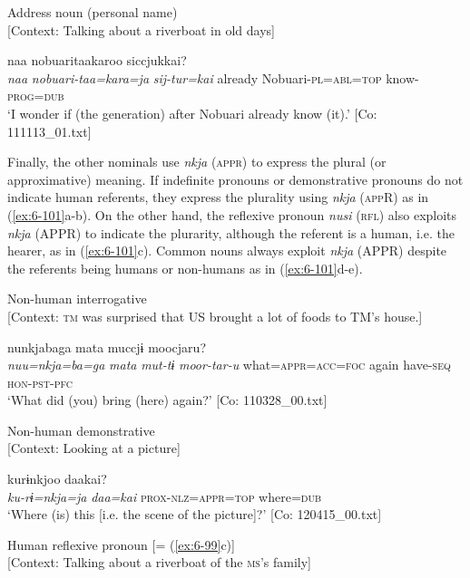 \ex Address noun (personal name)\\{}
[Context: Talking about a riverboat in old days]

{\TM}
\glll naa  nobuaritaakaroo  siccjukkai?\\
      \textit{naa}  \textit{nobuari-taa=kara=ja}  \textit{sij-tur=kai}
      already  Nobuari-\textsc{pl}=\textsc{abl}=\textsc{top}  know-\textsc{prog}=\textsc{dub}\\
\glt ‘I wonder if (the generation) after Nobuari already know (it).’ [Co: 111113\_01.txt]
\z

  Finally, the other nominals use \textit{nkja} (\textsc{appr}) to express the plural (or approximative) meaning. If indefinite pronouns or demonstrative pronouns do not indicate human referents, they express the plurality using \textit{nkja} (\textsc{app}R) as in (\ref{ex:6-101}a-b). On the other hand, the reflexive pronoun \textit{nusi} (\textsc{rfl}) also exploits \textit{nkja} (APPR) to indicate the plurarity, although the referent is a human, i.e. the hearer, as in (\ref{ex:6-101}c). Common nouns always exploit \textit{nkja} (APPR) despite the referents being humans or non-humans as in (\ref{ex:6-101}d-e).

\ea\label{ex:6-101}
 \ea Non-human interrogative\\{}
[Context: \textsc{tm} was surprised that US brought a lot of foods to TM’s house.]

{\TM}
\glll nunkjabaga  mata  muccjɨ  moocjaru?\\
      \textit{nuu=nkja=ba=ga}  \textit{mata}  \textit{mut-tɨ}  \textit{moor-tar-u}
      what=\textsc{appr}=\textsc{acc}=\textsc{foc}  again  have-\textsc{seq}  \textsc{hon}-\textsc{pst}-\textsc{pfc}\\
\glt ‘What did (you) bring (here) again?’ [Co: 110328\_00.txt]
\z

\ex Non-human demonstrative\\{}
[Context: Looking at a picture]

{\TM}
\glll kurɨnkjoo  daakai?\\
      \textit{ku-rɨ=nkja=ja}  \textit{daa=kai}
      \textsc{prox}-\textsc{nlz}=\textsc{appr}=\textsc{top}  where=\textsc{dub}\\
\glt ‘Where (is) this [i.e. the scene of the picture]?’ [Co: 120415\_00.txt]
\z

\ex Human reflexive pronoun [= (\ref{ex:6-99}c)]\\{}
[Context: Talking about a riverboat of the \textsc{ms}’s family]

